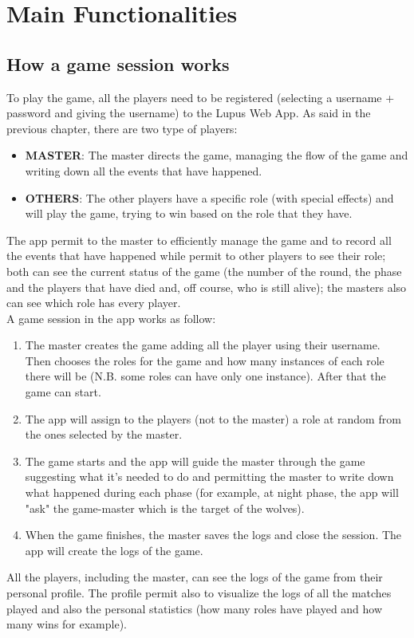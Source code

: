 \section{Main Functionalities}

\subsection{How a game session works}
To play the game, all the players need to be registered (selecting a username + password and giving the username) to the Lupus Web App. As said in the previous chapter, there are two type of players:
\begin{itemize}
    \item \textbf{MASTER}: The master directs the game, managing the flow of the game and writing down all the events that have happened.
    \item \textbf{OTHERS}: The other players have a specific role (with special effects) and will play the game, trying to win based on the role that they have. 
\end{itemize}
The app permit to the master to efficiently manage the game and to record all the events that have happened while permit to other players to see their role; both can see the current status of the game (the number of the round, the phase and the players that have died and, off course, who is still alive); the masters also can see which role has every player.
\\
A game session in the app works as follow:
\begin{enumerate}
    \item The master creates the game adding all the player using their username. Then chooses the roles for the game and how many instances of each role there will be (N.B. some roles can have only one instance). After that the game can start.
    \item The app will assign to the players (not to the master) a role at random from the ones selected by the master.
    \item The game starts and the app will guide the master through the game suggesting what it's needed to do and permitting the master to write down what happened during each phase (for example, at night phase, the app will "ask" the game-master which is the target of the wolves).
    \item When the game finishes, the master saves the logs and close the session. The app will create the logs of the game.
\end{enumerate}
All the players, including the master, can see the logs of the game from their personal profile. The profile permit also to visualize the logs of all the matches played and also the personal statistics (how many roles have played and how many wins for example).


